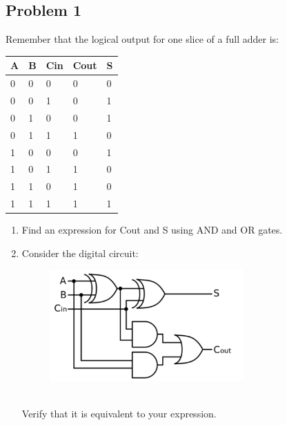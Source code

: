 \documentclass{article}
\begin{document}
\subsection*{Problem 1}
Remember that the logical output for one slice of a full adder is:
\begin{table}[!h]
\centering
\begin{tabular}{|l|l|l|l|l|}
\hline
\textbf{A} & \textbf{B} & \textbf{Cin} & \textbf{Cout} & \textbf{S} \\ \hline
0          & 0          & 0            & 0             & 0          \\ \hline
0          & 0          & 1            & 0             & 1          \\ \hline
0          & 1          & 0            & 0             & 1          \\ \hline
0          & 1          & 1            & 1             & 0          \\ \hline
1          & 0          & 0            & 0             & 1          \\ \hline
1          & 0          & 1            & 1             & 0          \\ \hline
1          & 1          & 0            & 1             & 0          \\ \hline
1          & 1          & 1            & 1             & 1          \\ \hline
\end{tabular}
\end{table}

\begin{enumerate}[label=\alph*.]
    \item Find an expression for Cout and S using AND and OR gates.
    \item Consider the digital circuit: 
    \begin{figure}[!h]
        \centering
        \includegraphics[width=0.7\textwidth]{figures/adder1b.png}
    \end{figure}
    \\ Verify that it is equivalent to your expression.
\end{enumerate}
\end{document}

